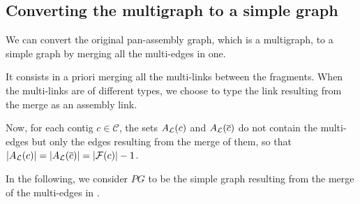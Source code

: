 \subsection{Converting the multigraph to a simple graph}

We can convert the original pan-assembly graph, which is a multigraph, to a simple graph by merging all the multi-edges in one.

It consists in a priori merging all the multi-links between the fragments.
When the multi-links are of different types, we choose to type the link resulting from the merge as an assembly link.

\begin{notebox}
  Now, for each contig \(c \in \mathcal{C}\), the sets \(A_{\mathcal{L}}{}(c)\) and \(A_{\mathcal{L}}{}(\overline{c})\) do not contain the multi-edges but only the edges resulting from the merge of them, so that \(|A_{\mathcal{L}}{}(c)| = |A_{\mathcal{L}}{}(\overline{c})| = |\mathcal{F}{}(c)| - 1\).
\end{notebox}

In the following, we consider \(PG\) to be the simple graph resulting from the merge of the multi-edges in \ELinks{}.
